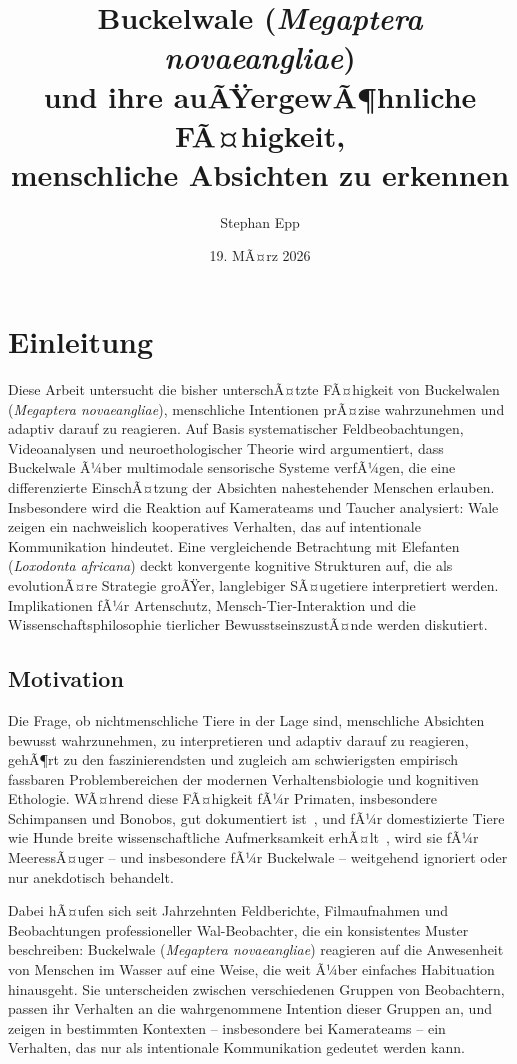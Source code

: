 ﻿\documentclass[12pt,a4paper]{article}
\title{Buckelwale (\textit{Megaptera novaeangliae})\\
	und ihre auÃŸergewÃ¶hnliche FÃ¤higkeit,\\
	menschliche Absichten zu erkennen}
\author{Stephan Epp}
\date{19. MÃ¤rz 2026}
\theoremstyle{definition}
\theoremstyle{remark}
\begin{document}
\maketitle
\tableofcontents
\newpage

\section{Einleitung}

Diese Arbeit untersucht die bisher unterschÃ¤tzte FÃ¤higkeit von Buckelwalen
(\textit{Megaptera novaeangliae}), menschliche Intentionen prÃ¤zise wahrzunehmen
und adaptiv darauf zu reagieren. Auf Basis systematischer Feldbeobachtungen,
Videoanalysen und neuroethologischer Theorie wird argumentiert, dass Buckelwale
Ã¼ber multimodale sensorische Systeme verfÃ¼gen, die eine differenzierte
EinschÃ¤tzung der Absichten nahestehender Menschen erlauben. Insbesondere wird
die Reaktion auf Kamerateams und Taucher analysiert: Wale zeigen ein
nachweislich kooperatives Verhalten, das auf intentionale Kommunikation
hindeutet. Eine vergleichende Betrachtung mit Elefanten (\textit{Loxodonta africana})
deckt konvergente kognitive Strukturen auf, die als evolutionÃ¤re Strategie
groÃŸer, langlebiger SÃ¤ugetiere interpretiert werden. Implikationen fÃ¼r
Artenschutz, Mensch-Tier-Interaktion und die Wissenschaftsphilosophie
tierlicher BewusstseinszustÃ¤nde werden diskutiert.

\subsection{Motivation}

Die Frage, ob nichtmenschliche Tiere in der Lage sind, menschliche Absichten
bewusst wahrzunehmen, zu interpretieren und adaptiv darauf zu reagieren, gehÃ¶rt
zu den faszinierendsten und zugleich am schwierigsten empirisch fassbaren
Problembereichen der modernen Verhaltensbiologie und kognitiven Ethologie.
WÃ¤hrend diese FÃ¤higkeit fÃ¼r Primaten, insbesondere Schimpansen und Bonobos,
gut dokumentiert ist~\cite{call2003chimpanzees}, und fÃ¼r domestizierte Tiere
wie Hunde breite wissenschaftliche Aufmerksamkeit erhÃ¤lt~\cite{miklosi2004dogs},
wird sie fÃ¼r MeeressÃ¤uger -- und insbesondere fÃ¼r Buckelwale -- weitgehend
ignoriert oder nur anekdotisch behandelt.

Dabei hÃ¤ufen sich seit Jahrzehnten Feldberichte, Filmaufnahmen und Beobachtungen
professioneller Wal-Beobachter, die ein konsistentes Muster beschreiben:
Buckelwale (\textit{Megaptera novaeangliae}) reagieren auf die Anwesenheit von
Menschen im Wasser auf eine Weise, die weit Ã¼ber einfaches Habituation hinausgeht.
Sie unterscheiden zwischen verschiedenen Gruppen von Beobachtern, passen ihr
Verhalten an die wahrgenommene Intention dieser Gruppen an, und zeigen in
bestimmten Kontexten -- insbesondere bei Kamerateams -- ein Verhalten, das nur
als intentionale Kommunikation gedeutet werden kann.
\end{document}
